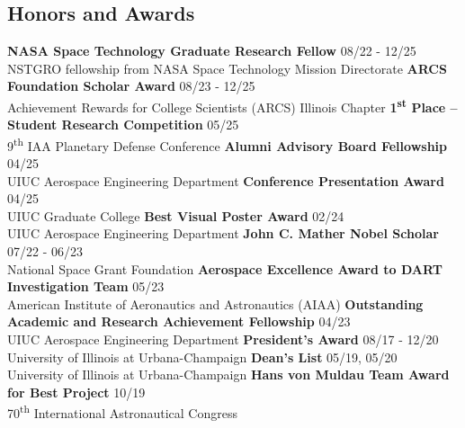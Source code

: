 \documentclass[margin,line]{res}
\newlength{\myitemspacing}
\begin{document}
\begin{resume}
\section{\sc Honors and Awards}
{\bf NASA Space Technology Graduate Research Fellow} \hfill 08/22  - 12/25\\
NSTGRO fellowship from NASA Space Technology Mission Directorate
\vspace{\myitemspacing}\newline
{\bf ARCS Foundation Scholar Award} \hfill 08/23 - 12/25\\
Achievement Rewards for College Scientists (ARCS) Illinois Chapter
\vspace{\myitemspacing}\newline
{\bf 1\textsuperscript{st} Place -- Student Research Competition} \hfill 05/25\\
9\textsuperscript{th} IAA Planetary Defense Conference
\vspace{\myitemspacing}\newline
{\bf Alumni Advisory Board Fellowship} \hfill 04/25\\
UIUC Aerospace Engineering Department
\vspace{\myitemspacing}\newline
{\bf Conference Presentation Award} \hfill 04/25\\
UIUC Graduate College
\vspace{\myitemspacing}\newline
{\bf Best Visual Poster Award} \hfill 02/24\\
UIUC Aerospace Engineering Department
\vspace{\myitemspacing}\newline
{\bf John C. Mather Nobel Scholar} \hfill 07/22 - 06/23\\
National Space Grant Foundation
\vspace{\myitemspacing}\newline
{\bf Aerospace Excellence Award to DART Investigation Team} \hfill 05/23\\
American Institute of Aeronautics and Astronautics (AIAA)
\vspace{\myitemspacing}\newline
{\bf Outstanding Academic and Research Achievement Fellowship} \hfill 04/23\\
UIUC Aerospace Engineering Department
\vspace{\myitemspacing}\newline
{\bf President's Award} \hfill 08/17 - 12/20\\
University of Illinois at Urbana-Champaign
\vspace{\myitemspacing}\newline
{\bf Dean's List} \hfill 05/19, 05/20\\
University of Illinois at Urbana-Champaign
\vspace{\myitemspacing}\newline
{\bf Hans von Muldau Team Award for Best Project} \hfill 10/19\\
70\textsuperscript{th} International Astronautical Congress


\end{resume}
\end{document}
